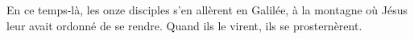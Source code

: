 En ce temps-là, les onze disciples s’en allèrent en Galilée,
	à la montagne où Jésus leur avait ordonné de se rendre.
Quand ils le virent, ils se prosternèrent.
